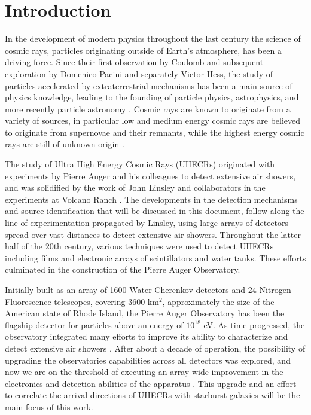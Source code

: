 
\chapter{Introduction}
\label{intro}
In the development of modern physics throughout the last century the science of cosmic rays, particles originating outside of Earth's atmosphere, has been a driving force. 
Since their first observation by Coulomb and subsequent exploration by Domenico Pacini and separately Victor Hess, the study of particles accelerated by extraterrestrial mechanisms has been a main source of physics knowledge, leading to the founding of particle physics, astrophysics, and more recently particle astronomy \cite{pacini}.  Cosmic rays are known to originate from a variety of sources, in particular low and medium energy cosmic rays are believed to originate from supernovae and their remnants, while the highest energy cosmic rays are still of unknown origin \cite{stanev}. 

The study of Ultra High Energy Cosmic Rays (UHECRs) originated with experiments by Pierre Auger and his colleagues to detect extensive air showers, and was solidified by the work of John Linsley and collaborators in the experiments at Volcano Ranch \cite{linsley}. The developments in the detection mechanisms and source identification that will be discussed in this document, follow along the line of experimentation propagated by Linsley, using large arrays of detectors spread over vast distances to detect extensive air showers. Throughout the latter half of the 20th century, various techniques were used to detect UHECRs including films and electronic arrays of scintillators and water tanks. These efforts culminated in the construction of the Pierre Auger Observatory. 

Initially built as an array of 1600 Water Cherenkov detectors and 24 Nitrogen Fluorescence telescopes, covering 3600 km$^2$, approximately the size of the American state of Rhode Island, the Pierre Auger Observatory has been the flagship detector for particles above an energy of $10^{18}$ eV. As time progressed, the observatory integrated many efforts to improve its ability to characterize and detect extensive air showers \cite{enhancements}. After about a decade of operation, the possibility of upgrading the observatories capabilities across all detectors was explored, and now we are on the threshold of executing an array-wide improvement in the electronics and detection abilities of the apparatus \cite{firstprime}. This upgrade and an effort to correlate the arrival directions of UHECRs with starburst galaxies will be the main focus of this work.

